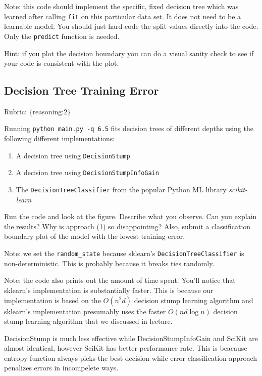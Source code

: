\documentclass{article}
\def\rubric#1{\gre{Rubric: \{#1\}}}{}
\def\blu#1{{\color{blu}#1}}
\def\gre#1{{\color{gre}#1}}
\def\enum#1{\begin{enumerate}#1\end{enumerate}}
\begin{document}
\begin{enumerate}
Note: this code should implement the specific, fixed decision tree
which was learned after calling \texttt{fit} on this particular data set. It does not need to be a learnable model.
You should just hard-code the split values directly into the code. Only the \texttt{predict} function is needed.

Hint: if you plot the decision boundary you can do a visual sanity check to see if your code is consistent with the plot.





\subsection{Decision Tree Training Error}
\rubric{reasoning:2}

Running \texttt{python main.py -q 6.5} fits decision trees of different depths using the following different implementations: 
\enum{
\item A decision tree using \texttt{DecisionStump}
\item A decision tree using \texttt{DecisionStumpInfoGain}
\item The \texttt{DecisionTreeClassifier} from the popular Python ML library \emph{scikit-learn}
}

Run the code and look at the figure.
\blu{Describe what you observe. Can you explain the results?} Why is approach (1) so disappointing? Also, \blu{submit a classification boundary plot of the model with the lowest training error}.

Note: we set the \verb|random_state| because sklearn's \texttt{DecisionTreeClassifier} is non-deterministic. This is probably
because it breaks ties randomly.

Note: the code also prints out the amount of time spent. You'll notice that sklearn's implementation is substantially faster. This is because
our implementation is based on the $O(n^2d)$ decision stump learning algorithm and sklearn's implementation presumably uses the faster $O(nd\log n)$
decision stump learning algorithm that we discussed in lecture.

\begin{center}\color{blu}
	DecisionStump is much less effective while DecisionStumpInfoGain and SciKit are almost identical, however SciKit has better performance rate. This is beacause entropy function always picks the best decision while error classification approach penalizes errors in incompelete ways.
\end{center}


\end{enumerate}
\end{document}
